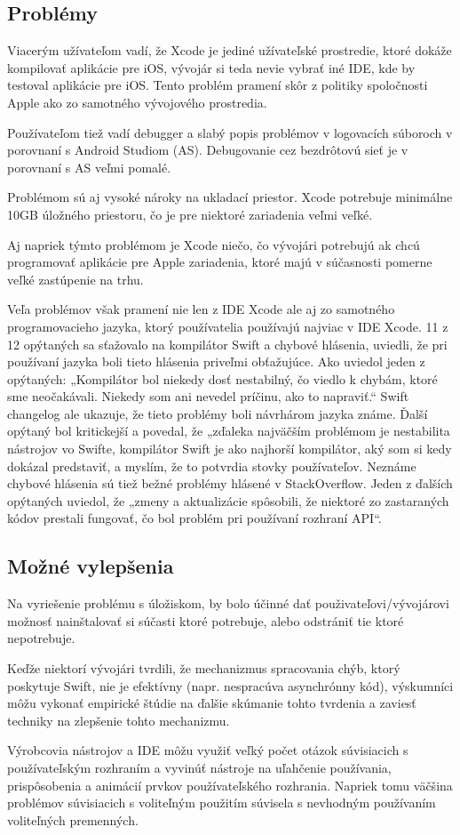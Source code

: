 \documentclass[12pt]{article}
\begin{document}
		\subsection{Problémy}
			Viacerým užívateľom vadí,  že Xcode je jediné užívateľské prostredie,  ktoré dokáže kompilovať aplikácie pre iOS,  vývojár si teda nevie vybrať iné IDE,  kde by testoval aplikácie pre iOS.  Tento problém pramení skôr z politiky spoločnosti Apple ako zo samotného vývojového prostredia.  \par
			Používateľom tiež vadí debugger a slabý popis problémov v logovacích súboroch v porovnaní s Android Studiom (AS).  Debugovanie cez bezdrôtovú sieť je v porovnaní s AS veľmi pomalé.  \par
			Problémom sú aj vysoké nároky na ukladací priestor.  Xcode potrebuje minimálne 10GB úložného priestoru,  čo je pre niektoré zariadenia veľmi veľké.  \par
			Aj napriek týmto problémom je Xcode niečo,  čo vývojári potrebujú ak chcú programovať aplikácie pre Apple zariadenia,  ktoré majú v súčasnosti pomerne veľké zastúpenie na trhu. \par
			Veľa problémov však pramení nie len z IDE Xcode ale aj zo samotného programovacieho jazyka, ktorý používatelia používajú najviac v IDE Xcode. 11 z 12 opýtaných sa sťažovalo na kompilátor Swift a chybové hlásenia, uviedli, že pri používaní jazyka boli tieto hlásenia priveľmi obťažujúce. Ako uviedol jeden z opýtaných: „Kompilátor bol niekedy dosť nestabilný, čo viedlo k chybám, ktoré sme neočakávali. Niekedy som ani nevedel príčinu, ako to napraviť.“ Swift changelog ale ukazuje, že tieto problémy boli návrhárom jazyka známe. Ďalší opýtaný bol kritickejší a povedal, že „zďaleka najväčším problémom je nestabilita nástrojov vo Swifte, kompilátor Swift je ako najhorší kompilátor, aký som si kedy dokázal predstaviť, a myslím, že to potvrdia stovky používateľov. Neznáme chybové hlásenia sú tiež bežné problémy hlásené v StackOverflow. Jeden z ďalších opýtaných uviedol, že „zmeny a aktualizácie spôsobili, že niektoré zo zastaraných kódov prestali fungovať, čo bol problém pri používaní rozhraní API“. \cite {xcodestud}

		\subsection{Možné vylepšenia}
			Na vyriešenie problému s úložiskom,  by bolo účinné dať použivateľovi/vývojárovi možnosť nainštalovať si súčasti ktoré potrebuje,  alebo odstrániť tie ktoré nepotrebuje. \par
			Keďže niektorí vývojári tvrdili, že mechanizmus spracovania chýb, ktorý poskytuje Swift, nie je efektívny (napr. nespracúva asynchrónny kód), výskumníci môžu vykonať empirické štúdie na ďalšie skúmanie tohto tvrdenia a zaviesť techniky na zlepšenie tohto mechanizmu.\cite {xcodestud} \par 
			Výrobcovia nástrojov a IDE môžu využiť veľký počet otázok súvisiacich s používateľským rozhraním a vyvinúť nástroje na uľahčenie používania, prispôsobenia a animácií prvkov používateľského rozhrania. Napriek tomu väčšina problémov súvisiacich s voliteľným použitím súvisela s nevhodným používaním voliteľných premenných. \cite {xcodestud}
\end{document}
